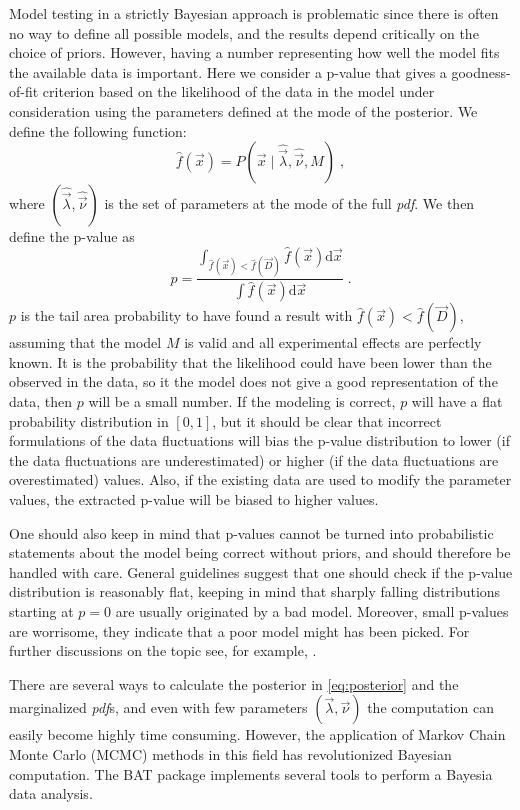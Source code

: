  Model testing in a strictly Bayesian approach is problematic since there is often no way to define all possible models, and the results depend critically on the choice of priors. However, having a number representing how well the model fits the available data is important. Here we consider a p-value that gives a goodness-of-fit criterion based on the likelihood of the data in the model under consideration using the parameters defined at the mode of the posterior. We define the following function:
\[\hat{f}(\vec{x})=P(\vec{x}\mid\hat{\vec{\lambda}},\hat{\vec{\nu}},M)\;,\]
where $(\hat{\vec{\lambda}},\hat{\vec{\nu}})$ is the set of parameters at the mode of the full \emph{pdf}. We then define the p-value as
\[p=\frac{\int_{\hat{f}(\vec{x})<\hat{f}(\vec{D})}\hat{f}(\vec{x})\text{d}\vec{x}}{\int \hat{f}(\vec{x})\text{d}\vec{x}}\;.\label{eq:pvalue}\]
$p$ is the tail area probability to have found a result with $\hat{f}(\vec{x})<\hat{f}(\vec{D})$, assuming that the model $M$ is valid and all experimental effects are perfectly known. It is the probability that the likelihood could have been lower than the observed in the data, so it the model does not give a good representation of the data, then $p$ will be a small number. If the modeling is correct, $p$ will have a flat probability distribution in $[0,1]$, but it should be clear that incorrect formulations of the data fluctuations will bias the p-value distribution to lower (if the data fluctuations are underestimated) or higher (if the data fluctuations are overestimated) values. Also, if the existing data are used to modify the parameter values, the extracted p-value will be biased to higher values.

One should also keep in mind that p-values cannot be turned into probabilistic statements about the model being correct without priors, and should therefore be handled with care. General guidelines suggest that one should check if the p-value distribution is reasonably flat, keeping in mind that sharply falling distributions starting at $p=0$ are usually originated by a bad model. Moreover, small p-values are worrisome, they indicate that a poor model might has been picked. For further discussions on the topic see, for example, \cite{p-value}.

 There are several ways to calculate the posterior in \ref{eq:posterior} and the marginalized \emph{pdf}s, and even with few parameters $(\vec{\lambda},\vec{\nu})$ the computation can easily become highly time consuming. However, the application of Markov Chain Monte Carlo (MCMC) methods in this field has revolutionized Bayesian computation. The BAT package \cite{BAT} implements several tools to perform a Bayesia data analysis.


